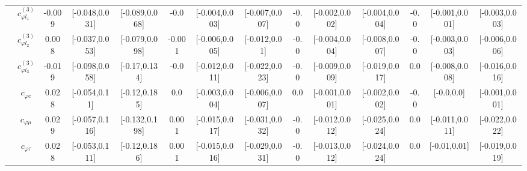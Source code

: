 \documentclass{article}
\begin{document}
\begin{table}[H]
\begin{tabular}{|c|c|c|c|c|c|c|c|c|c|c|c|c|c|}
 & $c_{\varphi l_1}^{(3)}$ & -0.009                             & [-0.048,0.031]                                 & [-0.089,0.068] & -0.0                             & [-0.004,0.003]                                 & [-0.007,0.007] & -0.0                             & [-0.002,0.002]                                 & [-0.004,0.004] & -0.0                             & [-0.001,0.001]                                 & [-0.003,0.003] \\ \cline{2-14}
 & $c_{\varphi l_2}^{(3)}$ & 0.008                             & [-0.037,0.053]                                 & [-0.079,0.098] & -0.001                             & [-0.006,0.005]                                 & [-0.012,0.01] & -0.0                             & [-0.004,0.004]                                 & [-0.008,0.007] & -0.0                             & [-0.003,0.003]                                 & [-0.006,0.006] \\ \cline{2-14}
 & $c_{\varphi l_3}^{(3)}$ & -0.019                             & [-0.098,0.058]                                 & [-0.17,0.134] & -0.0                             & [-0.012,0.011]                                 & [-0.022,0.023] & -0.0                             & [-0.009,0.009]                                 & [-0.019,0.017] & 0.0                             & [-0.008,0.008]                                 & [-0.016,0.016] \\ \cline{2-14}
 & $c_{\varphi e}$ & 0.028                             & [-0.054,0.11]                                 & [-0.12,0.185] & 0.0                             & [-0.003,0.004]                                 & [-0.006,0.007] & 0.0                             & [-0.001,0.001]                                 & [-0.002,0.002] & -0.0                             & [-0.0,0.0]                                 & [-0.001,0.001] \\ \cline{2-14}
 & $c_{\varphi \mu}$ & 0.029                             & [-0.057,0.116]                                 & [-0.132,0.198] & 0.001                             & [-0.015,0.017]                                 & [-0.031,0.032] & -0.0                             & [-0.012,0.012]                                 & [-0.025,0.024] & 0.0                             & [-0.011,0.011]                                 & [-0.022,0.022] \\ \cline{2-14}
 & $c_{\varphi \tau}$ & 0.028                             & [-0.053,0.111]                                 & [-0.12,0.186] & 0.001                             & [-0.015,0.016]                                 & [-0.029,0.031] & -0.0                             & [-0.013,0.012]                                 & [-0.024,0.024] & 0.0                             & [-0.01,0.01]                                 & [-0.019,0.019] \\ \cline{2-14}

\end{tabular}
\end{table}
\end{document}
